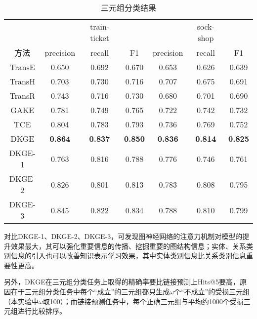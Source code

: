 \begin{table}[htbp]
    \caption{三元组分类结果}
    \centering
    \label{triple-class-result}
    \begin{tabular}{ccccccc}
    \toprule[1.5pt]
               &                & train-ticket   &                &                & sock-shop      &                \\
    方法         & precision      & recall         & F1             & precision      & recall         & F1             \\ \midrule[1.5pt]
    TransE     & 0.650          & 0.692          & 0.670          & 0.653          & 0.626          & 0.639          \\
    TransH     & 0.703          & 0.730          & 0.716          & 0.707          & 0.675          & 0.691          \\
    TransR     & 0.743          & 0.716          & 0.730          & 0.680          & 0.701          & 0.690          \\
    GAKE       & 0.781          & 0.749          & 0.765          & 0.722          & 0.742          & 0.732          \\
    TCE        & 0.804          & 0.783          & 0.793          & 0.736          & 0.769          & 0.752          \\
    DKGE   & \textbf{0.864} & \textbf{0.837} & \textbf{0.850} & \textbf{0.836} & \textbf{0.814} & \textbf{0.825} \\
    DKGE-1 & 0.763          & 0.816          & 0.788          & 0.776          & 0.746          & 0.761          \\
    DKGE-2 & 0.826          & 0.801          & 0.813          & 0.783          & 0.808          & 0.795          \\
    DKGE-3  & 0.845          & 0.822          & 0.834          & 0.788          & 0.810           & 0.799          \\ \bottomrule[1.5pt]
    \end{tabular}
\end{table}

对比DKGE-1、DKGE-2、DKGE-3，可发现图神经网络的注意力机制对模型的提升效果最大，其可以强化重要信息的传播、挖掘重要的图结构信息；实体、关系类别信息的引入也可以改善知识表示学习效果，其中实体类别信息比关系类别信息重要性更高。

另外，DKGE在三元组分类任务上取得的精确率要比链接预测上Hits@5要高，原因在于三元组分类任务中每个“成立”的三元组都只生成$\omega$个“不成立”的受损三元组（本实验中$\omega$取100）；而链接预测任务中，每个正确三元组与平均约1000个受损三元组进行比较排序。

